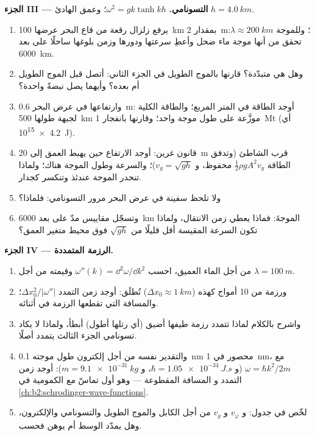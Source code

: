 \begin{problem}
\medskip
\noindent\textbf{الجزء III --- التسونامي.}
$\omega^2 = gk\tanh kh$؛ وعمق الهادئ $h = \qty{4.0}{km}$.
\begin{enumerate}[resume]
  \item يرفع زلزال رقعة من قاع البحر عرضها \qty{100}{km} بمقدار
        \qty{2}{m}؛ وللموجة $\lambda \approx \qty{200}{km}$: تحقق من أنها موجة
        ماء ضحل وأعطِ سرعتها ودورها وزمن
        بلوغها ساحلًا على بعد \qty{6000}{km}.
  \item وهل هي متبدّدة؟ قارنها بالموج الطويل في الجزء الثاني: أتصل
        قبل الموج الطويل أم بعده؟ وأيهما يصل نبضةً
        واحدة؟
  \item وارتفاعها في عرض البحر \qty{0.6}{m}: أوجد الطاقة في المتر المربع؛
        والطاقة الكلية لجبهة طولها \qty{500}{km} موزَّعة على طول
        موجة واحد؛ وقارنها بانفجار \qty{1}{Mt} (أي \qty{4.2e15}{J}).
  \item قانون غرين: أوجد الارتفاع حين يهبط العمق إلى \qty{20}{m} قرب
        الشاطئ (وتدفق الطاقة $\tfrac12\rho gA^2v_g$ محفوظ، و $v_g = \sqrt{gh}$)؛
        والسرعة وطول الموجة هناك؛ ولماذا تنحدر الموجة عندئذ
        وتنكسر كجدار.
  \item ولا تلحظ سفينة في عرض البحر مرور التسونامي: فلماذا؟
  \item وتسجّل مقاييس مدّ على بعد \qty{6000}{km} الموجةَ: فماذا يعطي
        زمن الانتقال، ولماذا تكون السرعة المقيسة أقل قليلًا
        من $\sqrt{gh}$ فوق محيط متغير العمق؟
\end{enumerate}

\medskip
\noindent\textbf{الجزء IV --- الرزمة المتمددة.}
\begin{enumerate}[resume]
  \item من أجل الماء العميق، احسب $\omega''(k) = \dd^2\omega/\dd k^2$ وقيمته
        من أجل $\lambda = \qty{100}{m}$.
  \item ورزمة من \qty{10}{} أمواج كهذه ($\Delta x_0 \approx \qty{1}{km}$)
        تُطلَق: أوجد زمن التمدد $\Delta x_0^2/|\omega''|$؛ والمسافة التي
        تقطعها الرزمة في أثنائه.
  \item واشرح بالكلام لماذا تتمدد رزمة طيفها أضيق
        (أي رتلها أطول) أبطأ، ولماذا لا يكاد تسونامي
        الجزء الثالث يتمدد أصلًا.
  \item والتقدير نفسه من أجل إلكترون طول موجته \qty{0.1}{nm}
        محصور في \qty{1}{nm}، مع $\omega = \hbar k^2/2m$ (و $\hbar =
        \qty{1.05e-34}{J.s}$، و $m = \qty{9.1e-31}{kg}$): أوجد زمن التمدد و
        المسافة المقطوعة --- وهو أول تماسّ مع 
        الكمومية في \cref{ch:b2:schrodinger-wave-functions}.
  \item لخّص في جدول:  و $v_\varphi$ و $v_g$ من أجل الكابل
        والموج الطويل والتسونامي والإلكترون، وهل يمدّد
        الوسط أم يوهن فحسب.
\end{enumerate}
\end{problem}
